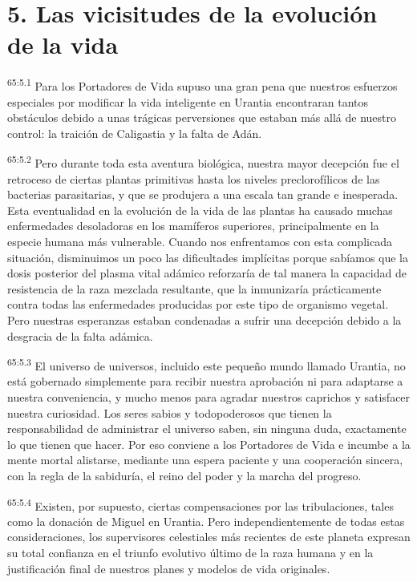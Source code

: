\section*{5. Las vicisitudes de la evolución de la vida}
\par
\textsuperscript{65:5.1} Para los Portadores de Vida supuso una gran pena que nuestros esfuerzos especiales por modificar la vida inteligente en Urantia encontraran tantos obstáculos debido a unas trágicas perversiones que estaban más allá de nuestro control: la traición de Caligastia y la falta de Adán.

\par
\textsuperscript{65:5.2} Pero durante toda esta aventura biológica, nuestra mayor decepción fue el retroceso de ciertas plantas primitivas hasta los niveles preclorofílicos de las bacterias parasitarias, y que se produjera a una escala tan grande e inesperada. Esta eventualidad en la evolución de la vida de las plantas ha causado muchas enfermedades desoladoras en los mamíferos superiores, principalmente en la especie humana más vulnerable. Cuando nos enfrentamos con esta complicada situación, disminuimos un poco las dificultades implícitas porque sabíamos que la dosis posterior del plasma vital adámico reforzaría de tal manera la capacidad de resistencia de la raza mezclada resultante, que la inmunizaría prácticamente contra todas las enfermedades producidas por este tipo de organismo vegetal. Pero nuestras esperanzas estaban condenadas a sufrir una decepción debido a la desgracia de la falta adámica.

\par
\textsuperscript{65:5.3} El universo de universos, incluido este pequeño mundo llamado Urantia, no está gobernado simplemente para recibir nuestra aprobación ni para adaptarse a nuestra conveniencia, y mucho menos para agradar nuestros caprichos y satisfacer nuestra curiosidad. Los seres sabios y todopoderosos que tienen la responsabilidad de administrar el universo saben, sin ninguna duda, exactamente lo que tienen que hacer. Por eso conviene a los Portadores de Vida e incumbe a la mente mortal alistarse, mediante una espera paciente y una cooperación sincera, con la regla de la sabiduría, el reino del poder y la marcha del progreso.

\par
\textsuperscript{65:5.4} Existen, por supuesto, ciertas compensaciones por las tribulaciones, tales como la donación de Miguel en Urantia. Pero independientemente de todas estas consideraciones, los supervisores celestiales más recientes de este planeta expresan su total confianza en el triunfo evolutivo último de la raza humana y en la justificación final de nuestros planes y modelos de vida originales.

